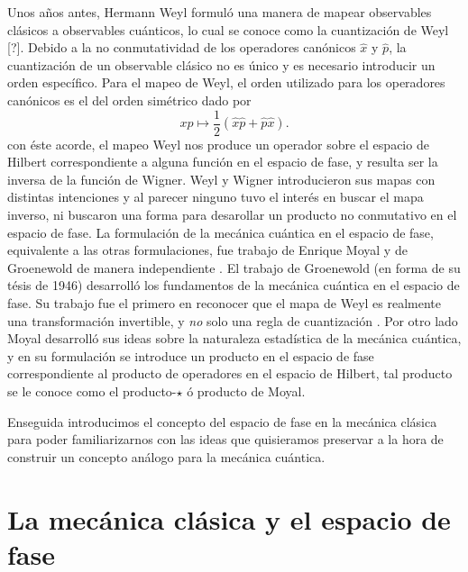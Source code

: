 \documentclass[a4paper]{report}
\begin{document}
  Unos años antes, Hermann Weyl formuló una manera de mapear
  observables clásicos a observables cuánticos, lo cual se
  conoce como la cuantización de Weyl [?]. Debido a la no
  conmutatividad de los operadores canónicos $\hat{x}$ y
  $\hat{p}$, la cuantización de un observable clásico no es
  único y es necesario introducir un orden específico. Para
  el mapeo de Weyl, el orden utilizado para los operadores
  canónicos es el del orden simétrico dado por
  \[
    xp \mapsto
    \frac{1}{2}\left( \hat{x} \hat{p} + \hat{p} \hat{x}
    \right).
  \]
  con éste acorde, el mapeo Weyl nos produce un operador
  sobre el espacio de Hilbert correspondiente a alguna
  función en el espacio de fase, y resulta ser la
  inversa de la función de Wigner. Weyl y Wigner
  introducieron sus mapas con distintas intenciones y al
  parecer ninguno tuvo el interés en buscar el mapa inverso,
  ni buscaron una forma para desarollar un producto no
  conmutativo en el espacio de fase. La formulación de la
  mecánica cuántica en el espacio de fase, equivalente a las
  otras formulaciones, fue trabajo de Enrique Moyal y de
  Groenewold de manera independiente
  \cite{curtrightQuantumMechanicsPhase2012}.  El trabajo de
  Groenewold (en forma de su tésis de 1946) desarrolló los
  fundamentos de la mecánica cuántica en el espacio de fase.
  Su trabajo fue el primero en reconocer que el mapa de Weyl
  es realmente una transformación invertible, y \textit{no}
  solo una regla de cuantización
  \cite{todorovQuantizationMystery2012}. Por otro lado Moyal
  desarrolló sus ideas sobre la naturaleza estadística de la
  mecánica cuántica, y en su formulación se introduce un
  producto en el espacio de fase correspondiente al producto
  de operadores en el espacio de Hilbert, tal producto se le
  conoce como el producto-$\star$ ó producto de Moyal.

  Enseguida introducimos el concepto del espacio de fase
  en la mecánica clásica para poder familiarizarnos con las
  ideas que quisieramos preservar a la hora de construir un
  concepto análogo para la mecánica cuántica.

  \section{La mecánica clásica y el espacio de fase}
\end{document}
